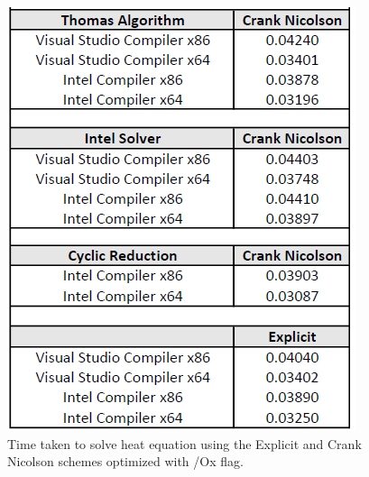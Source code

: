 \documentclass[12pt, oneside]{book}
\theoremstyle{plain}
\theoremstyle{definition}
\begin{document}
\begin{figure}[!htb]
\begin{minipage}[b]{0.5\textwidth}
    \includegraphics[width=\textwidth]{bsXOptimized.png}
    \caption{Time taken to solve heat equation using the Explicit and Crank Nicolson schemes  optimized with /Ox flag.}
  \end{minipage}
\end{figure}





\end{document}
